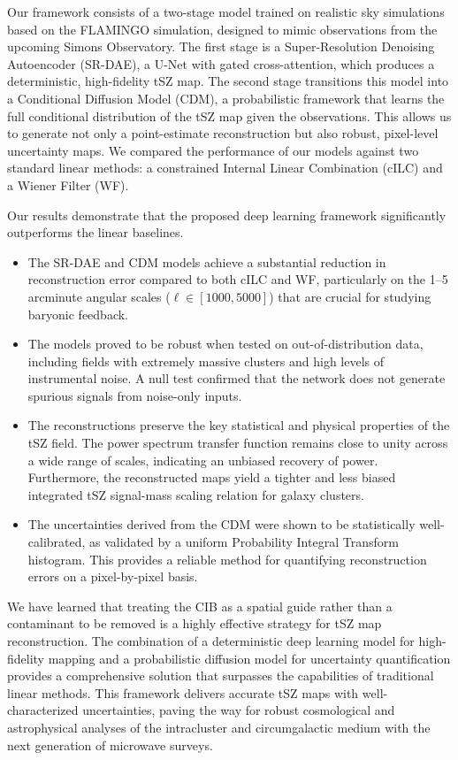 \documentclass[]{article}
\begin{document}
Our framework consists of a two-stage model trained on realistic sky simulations based on the FLAMINGO simulation, designed to mimic observations from the upcoming Simons Observatory. The first stage is a Super-Resolution Denoising Autoencoder (SR-DAE), a U-Net with gated cross-attention, which produces a deterministic, high-fidelity tSZ map. The second stage transitions this model into a Conditional Diffusion Model (CDM), a probabilistic framework that learns the full conditional distribution of the tSZ map given the observations. This allows us to generate not only a point-estimate reconstruction but also robust, pixel-level uncertainty maps. We compared the performance of our models against two standard linear methods: a constrained Internal Linear Combination (cILC) and a Wiener Filter (WF).

Our results demonstrate that the proposed deep learning framework significantly outperforms the linear baselines.
\begin{itemize}
    \item The SR-DAE and CDM models achieve a substantial reduction in reconstruction error compared to both cILC and WF, particularly on the 1--5 arcminute angular scales ($\ell \in [1000, 5000]$) that are crucial for studying baryonic feedback.
    \item The models proved to be robust when tested on out-of-distribution data, including fields with extremely massive clusters and high levels of instrumental noise. A null test confirmed that the network does not generate spurious signals from noise-only inputs.
    \item The reconstructions preserve the key statistical and physical properties of the tSZ field. The power spectrum transfer function remains close to unity across a wide range of scales, indicating an unbiased recovery of power. Furthermore, the reconstructed maps yield a tighter and less biased integrated tSZ signal-mass scaling relation for galaxy clusters.
    \item The uncertainties derived from the CDM were shown to be statistically well-calibrated, as validated by a uniform Probability Integral Transform histogram. This provides a reliable method for quantifying reconstruction errors on a pixel-by-pixel basis.
\end{itemize}

We have learned that treating the CIB as a spatial guide rather than a contaminant to be removed is a highly effective strategy for tSZ map reconstruction. The combination of a deterministic deep learning model for high-fidelity mapping and a probabilistic diffusion model for uncertainty quantification provides a comprehensive solution that surpasses the capabilities of traditional linear methods. This framework delivers accurate tSZ maps with well-characterized uncertainties, paving the way for robust cosmological and astrophysical analyses of the intracluster and circumgalactic medium with the next generation of microwave surveys.


{}

\end{document}
